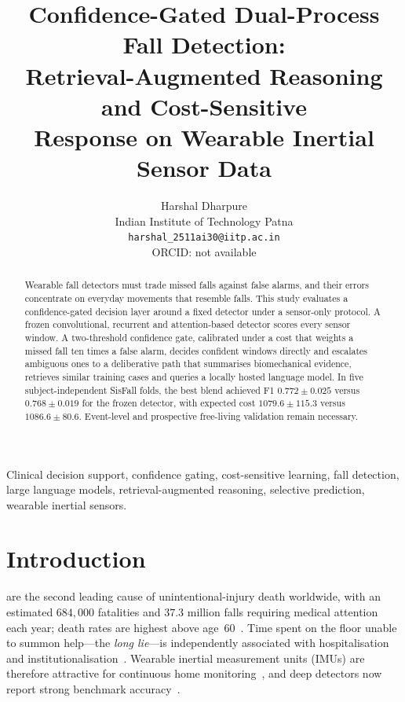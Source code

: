 \documentclass[journal]{IEEEtran}
\begin{document}
\title{Confidence-Gated Dual-Process Fall Detection:\\
Retrieval-Augmented Reasoning and Cost-Sensitive\\
Response on Wearable Inertial Sensor Data}

\author{Harshal Dharpure\\
Indian Institute of Technology Patna\\
\texttt{harshal\_2511ai30@iitp.ac.in}\\
ORCID: not available}

\maketitle

\begin{abstract}
Wearable fall detectors must trade missed falls against false alarms, and their errors concentrate on everyday movements that resemble falls. This study evaluates a confidence-gated decision layer around a fixed detector under a sensor-only protocol. A frozen convolutional, recurrent and attention-based detector scores every sensor window. A two-threshold confidence gate, calibrated under a cost that weights a missed fall ten times a false alarm, decides confident windows directly and escalates ambiguous ones to a deliberative path that summarises biomechanical evidence, retrieves similar training cases and queries a locally hosted language model. In five subject-independent SisFall folds, the best blend achieved F1 $0.772\pm0.025$ versus $0.768\pm0.019$ for the frozen detector, with expected cost $1079.6\pm115.3$ versus $1086.6\pm80.6$. Event-level and prospective free-living validation remain necessary.
\end{abstract}

\begin{IEEEkeywords}
Clinical decision support, confidence gating, cost-sensitive learning, fall detection, large language models, retrieval-augmented reasoning, selective prediction, wearable inertial sensors.
\end{IEEEkeywords}

\section{Introduction}
\label{sec:intro}

 are the second leading cause of unintentional-injury death worldwide, with an estimated $684{,}000$ fatalities and $37.3$ million falls requiring medical attention each year; death rates are highest above age~60~\cite{who2021falls}. Time spent on the floor unable to summon help---the \emph{long lie}---is independently associated with hospitalisation and institutionalisation~\cite{fleming2008longlie,tinetti1997falls}. Wearable inertial measurement units (IMUs) are therefore attractive for continuous home monitoring~\cite{iglesias2019wearable,nurek2020fallsurvey,khan2017review,sisfall2017}, and deep detectors now report strong benchmark accuracy~\cite{ren2021survey,mubashir2013survey}.
\end{document}

